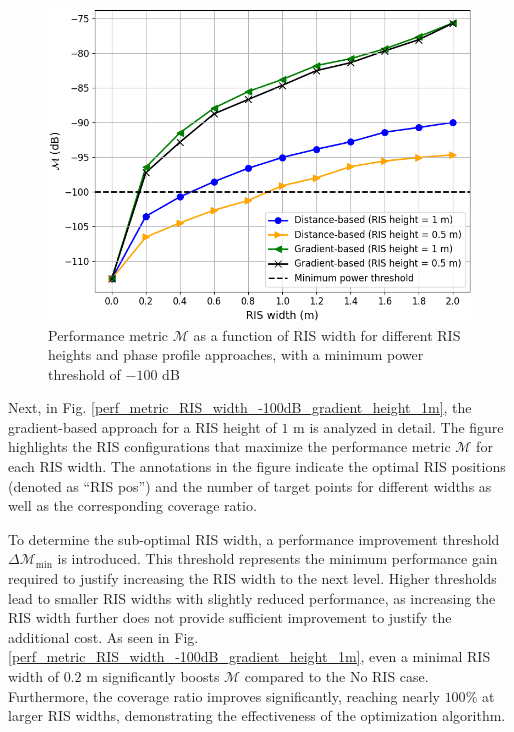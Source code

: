 \documentclass{IEEEoj}
\begin{document}
\begin{figure}
	\centering
	\includegraphics[width=.9\linewidth]{Sim_Results/perf_metric_RIS_width_multiple_curves_-100dB.png}
	\caption{Performance metric $\mathcal{M}$ as a function of RIS width for different RIS heights and phase profile approaches, with a minimum power threshold of $-100$ dB}
	\label{perf_metric_RIS_width_multiple_curves_-100dB}
\end{figure}

Next, in Fig. \ref{perf_metric_RIS_width_-100dB_gradient_height_1m}, the gradient-based approach for a RIS height of $1$ m is analyzed in detail. The figure highlights the RIS configurations that maximize the performance metric $\mathcal{M}$ for each RIS width. The annotations in the figure indicate the optimal RIS positions (denoted as “RIS pos”) and the number of target points for different widths as well as the corresponding coverage ratio. 

To determine the sub-optimal RIS width, a performance improvement threshold $\Delta \mathcal{M}_{\text{min}}$ is introduced. This threshold represents the minimum performance gain required to justify increasing the RIS width to the next level. Higher thresholds lead to smaller RIS widths with slightly reduced performance, as increasing the RIS width further does not provide sufficient improvement to justify the additional cost. As seen in Fig. \ref{perf_metric_RIS_width_-100dB_gradient_height_1m}, even a minimal RIS width of $0.2$ m significantly boosts $\mathcal{M}$ compared to the No RIS case. Furthermore, the coverage ratio improves significantly, reaching nearly $100\%$ at larger RIS widths, demonstrating the effectiveness of the optimization algorithm.
\end{document}
